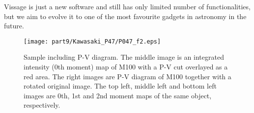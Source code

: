 Vissage is just a new software and still has only limited number of 
functionalities, but we aim to evolve it to one of the most favourite gadgets 
in astronomy in the future. 

\begin{figure}[tb]
  \centering
  \texttt{[image: part9/Kawasaki\_P47/P047\_f2.eps]}
  \caption{Sample including P-V diagram. The middle image is an integrated intensity (0th moment) map of M100 with a P-V cut overlayed as a red area. The right images are P-V diagram of M100 together with a rotated original image. The top left, middle left and bottom left images are 0th, 1st and 2nd moment maps of the same object, respectively.}
  \label{Kfig2}
\end{figure}



